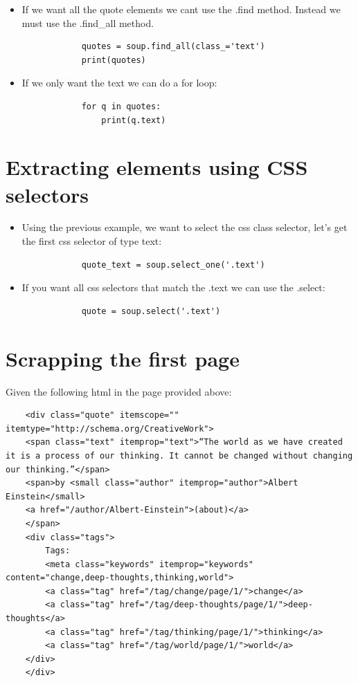 \begin{itemize}
    \item If we want all the quote elements we cant use the .find method. Instead we must use the .find\_all method.
        \begin{verbatim}
            quotes = soup.find_all(class_='text')
            print(quotes)
        \end{verbatim}
    
    \item If we only want the text we can do a for loop:
        \begin{verbatim}
            for q in quotes:
                print(q.text)
        \end{verbatim}
\end{itemize}

\section{Extracting elements using CSS selectors}
\begin{itemize}
    \item Using the previous example, we want to select the css class selector, let's get the first css selector of type text:
        \begin{verbatim}
            quote_text = soup.select_one('.text')
        \end{verbatim}
    
    \item If you want all css selectors that match the .text we can use the .select:
        \begin{verbatim}
            quote = soup.select('.text')
        \end{verbatim}
\end{itemize}

\section{Scrapping the first page}
Given the following html in the page provided above:
\begin{verbatim}
    <div class="quote" itemscope="" itemtype="http://schema.org/CreativeWork">
    <span class="text" itemprop="text">“The world as we have created it is a process of our thinking. It cannot be changed without changing our thinking.”</span>
    <span>by <small class="author" itemprop="author">Albert Einstein</small>
    <a href="/author/Albert-Einstein">(about)</a>
    </span>
    <div class="tags">
        Tags:
        <meta class="keywords" itemprop="keywords" content="change,deep-thoughts,thinking,world"> 
        <a class="tag" href="/tag/change/page/1/">change</a>
        <a class="tag" href="/tag/deep-thoughts/page/1/">deep-thoughts</a>
        <a class="tag" href="/tag/thinking/page/1/">thinking</a>
        <a class="tag" href="/tag/world/page/1/">world</a>
    </div>
    </div>
\end{verbatim}

